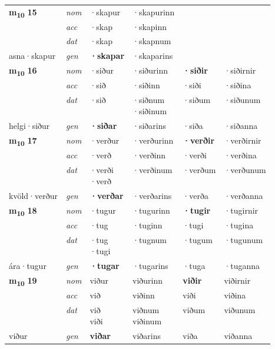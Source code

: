 \begin{longtable}[l]{X>{\footnotesize\itshape}XXXXX}
\multirow{3}{*}{{{\textbf{m{\textsubscript{10}}} \Large{\textbf{15}}}}} & nom & ·skapur & ·skapurinn & \textbf{} &  \\*
 & acc & ·skap & ·skapinn &  &  \\*
 & dat & ·skap & ·skapnum &  &  \\*
 {\footnotesize{asna\allowbreak ·skapur}} & gen & \textbf{·skapar} & ·skaparins &  &  \\
\cmidrule{1-6}

\multirow{3}{*}{{{\textbf{m{\textsubscript{10}}} \Large{\textbf{16}}}}} & nom & ·siður & ·siðurinn & \textbf{·siðir} & ·siðirnir \\*
 & acc & ·sið & ·siðinn & ·siði & ·siðina \\*
 & dat & ·sið & \specialcell{·siðnum\\  ·siðinum} & ·siðum & ·siðunum \\*
 {\footnotesize{helgi\allowbreak ·siður}} & gen & \textbf{·siðar} & ·siðarins & ·siða & ·siðanna \\
\cmidrule{1-6}

\multirow{3}{*}{{{\textbf{m{\textsubscript{10}}} \Large{\textbf{17}}}}} & nom & ·verður & ·verðurinn & \textbf{·verðir} & ·verðirnir \\*
 & acc & ·verð & ·verðinn & ·verði & ·verðina \\*
 & dat & \specialcell{·verði\\  ·verð} & ·verðinum & ·verðum & ·verðunum \\*
 {\footnotesize{kvöld\allowbreak ·verður}} & gen & \textbf{·verðar} & ·verðarins & ·verða & ·verðanna \\
\cmidrule{1-6}

\multirow{3}{*}{{{\textbf{m{\textsubscript{10}}} \Large{\textbf{18}}}}} & nom & ·tugur & ·tugurinn & \textbf{·tugir} & ·tugirnir \\*
 & acc & ·tug & ·tuginn & ·tugi & ·tugina \\*
 & dat & \specialcell{·tug\\  ·tugi} & ·tugnum & ·tugum & ·tugunum \\*
 {\footnotesize{ára\allowbreak ·tugur}} & gen & \textbf{·tugar} & ·tugarins & ·tuga & ·tuganna \\
\cmidrule{1-6}

\multirow{3}{*}{{{\textbf{m{\textsubscript{10}}} \Large{\textbf{19}}}}} & nom & viður & viðurinn & \textbf{viðir} & viðirnir \\*
 & acc & við & viðinn & viði & viðina \\*
 & dat & \specialcell{við\\ viði} & \specialcell{viðnum\\ viðinum} & viðum & viðunum \\*
 {\footnotesize{viður}} & gen & \textbf{viðar} & viðarins & viða & viðanna \\
\cmidrule{1-6}


\end{longtable}
